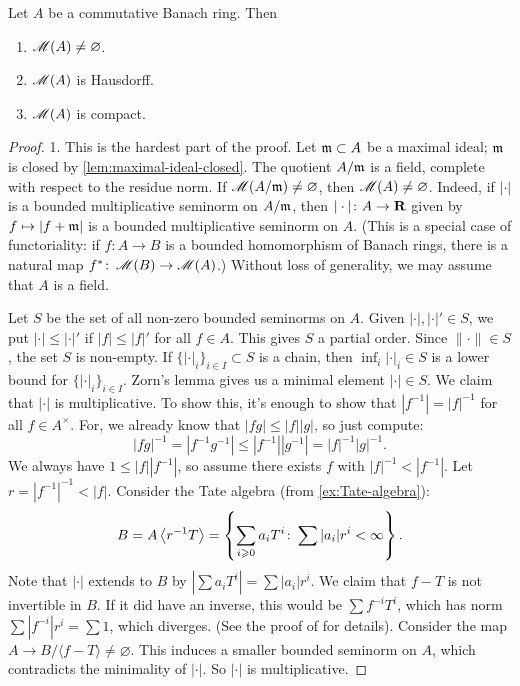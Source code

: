 \begin{theorem}\label{thm:Berkspec-not-empty}
Let $A$ be a commutative Banach ring. Then 
\begin{enumerate}
\item
$\operatorname{\mathscr{M}}(A)\ne\varnothing$. 

\item
$\operatorname{\mathscr{M}}(A)$ is Hausdorff. 

\item
$\operatorname{\mathscr{M}}(A)$ is compact. 
\end{enumerate}
\end{theorem}
\begin{proof}
1. This is the hardest part of the proof. Let $\mathfrak{m}\subset A$ be a maximal 
ideal; $\mathfrak{m}$ is closed by \autoref{lem:maximal-ideal-closed}. The quotient 
$A/\mathfrak{m}$ is a field, complete with respect to the residue norm. If 
$\operatorname{\mathscr{M}}(A/\mathfrak{m})\ne\varnothing$, then $\operatorname{\mathscr{M}}(A)\ne\varnothing$. Indeed, 
if $|\cdot|$ is a bounded multiplicative seminorm on $A/\mathfrak{m}$, then 
$|\cdot|\colon A\to \mathbf{R}$ given by $f\mapsto |f+\mathfrak{m}|$ is a bounded 
multiplicative seminorm on $A$. (This is a special case of functoriality: if 
$f\colon A\to B$ is a bounded homomorphism of Banach rings, there is a natural 
map $f^\ast\colon \operatorname{\mathscr{M}}(B)\to \operatorname{\mathscr{M}}(A)$.) Without loss of generality, 
we may assume that $A$ is a field. 

Let $S$ be the set of all non-zero bounded seminorms on $A$. Given 
$|\cdot|,|\cdot|'\in S$, we put $|\cdot|\leqslant |\cdot|'$ if 
$|f|\leqslant |f|'$ for all $f\in A$. This gives $S$ a partial order. Since 
$\|\cdot\|\in S$, the set $S$ is non-empty. If 
$\{|\cdot|_i\}_{i\in I}\subset S$ is a chain, then $\inf_i |\cdot|_i\in S$ is 
a lower bound for $\{|\cdot|_i\}_{i\in I}$. Zorn's lemma gives us a minimal 
element $|\cdot|\in S$. We claim that 
$|\cdot|$ is multiplicative. To show this, it's enough to show that 
$|f^{-1}| = |f|^{-1}$ for all $f\in A^\times$. For, we already know that 
$|f g|\leqslant |f| |g|$, so just compute:
\[
  |f g|^{-1} = |f^{-1} g^{-1}| \leqslant |f^{-1}| |g^{-1}| = |f|^{-1} |g|^{-1} .
\]
We always have $1\leqslant |f| |f^{-1}|$, so assume there exists $f$ with 
$|f|^{-1}<|f^{-1}|$. Let $r=|f^{-1}|^{-1}<|f|$. Consider the 
Tate algebra (from \autoref{ex:Tate-algebra}):
\[
  B = A\left\langle r^{-1} T \right\rangle = \left\{\sum_{i\geqslant 0} a_i T^i\colon \sum |a_i| r^i < \infty\right\} .
\]
Note that $|\cdot|$ extends to $B$ by $|\sum a_i T^i| = \sum |a_i| r^i$. We 
claim that $f-T$ is not invertible in $B$. If it did have an inverse, this 
would be $\sum f^{-i} T^i$, which has norm $\sum |f^{-i}| r^i = \sum 1$, which 
diverges. (See the proof of \cite[1.2.1]{berkovich-1990} for details). Consider 
the map $A\to B/\langle f-T\rangle\ne\varnothing$. This induces a smaller 
bounded seminorm on $A$, which contradicts the minimality of $|\cdot|$. So 
$|\cdot|$ is multiplicative. 


\end{proof}
